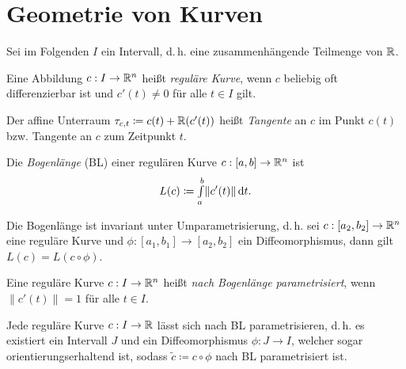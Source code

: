 \documentclass{cheat-sheet}
\newcommand{\Intabdt}[1]{\Int{a}{b}{#1}{t}}
\begin{document}


\section{Geometrie von Kurven}


\begin{nota}
  Sei im Folgenden $I$ ein Intervall, d.\,h. eine zusammenhängende Teilmenge von $\mathbb{R}$.
\end{nota}

\begin{definition}
  Eine Abbildung $c : I \to \mathbb{R}^n$ heißt \emph{reguläre Kurve}, wenn $c$ beliebig oft differenzierbar ist und $c'(t) \not= 0$ für alle $t \in I$ gilt.

  Der affine Unterraum $\tau_{c,t} \coloneqq c(t) + \mathbb{R}(c'(t))$ heißt \emph{Tangente} an $c$ im Punkt $c(t)$ bzw. Tangente an $c$ zum Zeitpunkt $t$.
\end{definition}


\begin{definition}
  Die \emph{Bogenlänge} (BL) einer regulären Kurve $c : [a, b] \to \mathbb{R}^n$ ist
  \[ L(c) \coloneqq \Intabdt{\|c'(t)\|}. \]
\end{definition}

\begin{satz}
  Die Bogenlänge ist invariant unter Umparametrisierung, d.\,h. sei $c : [a_2, b_2] \to \mathbb{R}^n$ eine reguläre Kurve und $\phi : [a_1, b_1] \to [a_2, b_2]$ ein Diffeomorphismus, dann gilt $L(c) = L(c \circ \phi)$.
\end{satz}

\begin{definition}
  Eine reguläre Kurve $c : I \to \mathbb{R}^n$ heißt \emph{nach Bogenlänge parametrisiert}, wenn $\| c'(t) \| = 1$ für alle $t \in I$.
\end{definition}

\begin{satz}
  Jede reguläre Kurve $c : I \to \mathbb{R}$ lässt sich nach BL parametrisieren, d.\,h. es existiert ein Intervall $J$ und ein Diffeomorphismus $\phi : J \to I$, welcher sogar orientierungserhaltend ist, sodass $\tilde{c} \coloneqq c \circ \phi$ nach BL parametrisiert ist.
\end{satz}
\end{document}
